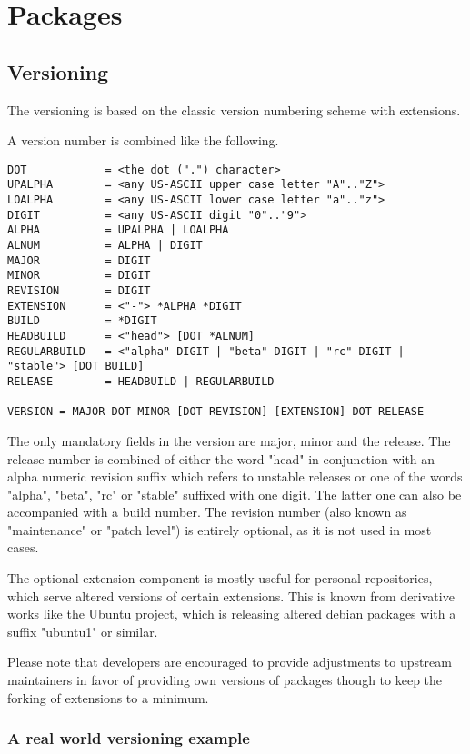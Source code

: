 \chapter{Packages}

\section[sec:versioning]{Versioning}
The versioning is based on the classic version numbering scheme with extensions.

A version number is combined like the following.

\begin{lstlisting}[caption=Version number in EBNF]
DOT            = <the dot (".") character>
UPALPHA        = <any US-ASCII upper case letter "A".."Z">
LOALPHA        = <any US-ASCII lower case letter "a".."z">
DIGIT          = <any US-ASCII digit "0".."9">
ALPHA          = UPALPHA | LOALPHA
ALNUM          = ALPHA | DIGIT
MAJOR          = DIGIT
MINOR          = DIGIT
REVISION       = DIGIT
EXTENSION      = <"-"> *ALPHA *DIGIT
BUILD          = *DIGIT
HEADBUILD      = <"head"> [DOT *ALNUM]
REGULARBUILD   = <"alpha" DIGIT | "beta" DIGIT | "rc" DIGIT | "stable"> [DOT BUILD]
RELEASE        = HEADBUILD | REGULARBUILD

VERSION = MAJOR DOT MINOR [DOT REVISION] [EXTENSION] DOT RELEASE
\end{lstlisting}

The only mandatory fields in the version are major, minor and the release. 
The release number is combined of either the word "head" in conjunction with an alpha numeric revision suffix which refers to unstable releases or one of the words "alpha", "beta", "rc" or "stable" suffixed with one digit. The latter one can also be accompanied with a build number.
The revision number (also known as "maintenance" or "patch level") is entirely optional, as it is not used in most cases.

The optional extension component is mostly useful for personal repositories, which serve altered versions of certain extensions. This is known from derivative works like the Ubuntu project, which is releasing altered debian packages with a suffix "ubuntu1" or similar.

Please note that developers are encouraged to provide adjustments to upstream maintainers in favor of providing own versions of packages though to keep the forking of extensions to a minimum.

\subsection[sec:versioning real word examples]{A real world versioning example}

